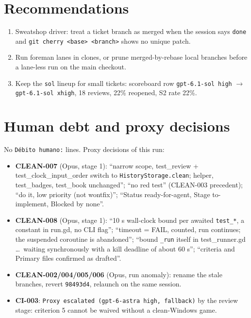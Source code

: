 \documentclass[11pt,a4paper]{article}
\begin{document}
\section*{Recommendations}

\begin{enumerate}
  \item Sweatshop driver: treat a ticket branch as merged when the session says \texttt{done}
        and \texttt{git cherry <base> <branch>} shows no unique patch.
  \item Run foreman lanes in clones, or prune merged-by-rebase local branches before a
        lane-less run on the main checkout.
  \item Keep the \texttt{sol} lineup for small tickets: scoreboard row \texttt{gpt-6.1-sol high}
        $\rightarrow$ \texttt{gpt-6.1-sol xhigh}, 18 reviews, 22\% reopened, S2 rate 22\%.
\end{enumerate}

\section*{Human debt and proxy decisions}

No \texttt{Débito humano:} lines. Proxy decisions of this run:

\begin{itemize}
  \item \textbf{CLEAN-007} (Opus, stage 1): ``narrow scope, test\_review + test\_clock\_input\_order
        switch to \texttt{HistoryStorage.clean}; helper, test\_badges, test\_book unchanged'';
        ``no red test'' (CLEAN-003 precedent); ``do it, low priority (not wontfix)'';
        ``Status ready-for-agent, Stage to-implement, Blocked by none''.
  \item \textbf{CLEAN-008} (Opus, stage 1): ``10 s wall-clock bound per awaited
        \texttt{test\_*}, a constant in run.gd, no CLI flag''; ``timeout = FAIL, counted, run
        continues; the suspended coroutine is abandoned''; ``bound \texttt{\_run} itself in
        test\_runner.gd \ldots\ waiting synchronously with a kill deadline of about 60 s'';
        ``criteria and Primary files confirmed as drafted''.
  \item \textbf{CLEAN-002/004/005/006} (Opus, run anomaly): rename the stale branches, revert
        \texttt{98493d4}, relaunch on the same session.
  \item \textbf{CI-003}: \texttt{Proxy escalated (gpt-6-astra high, fallback)} by the review
        stage: criterion 5 cannot be waived without a clean-Windows game.
\end{itemize}
\end{document}

